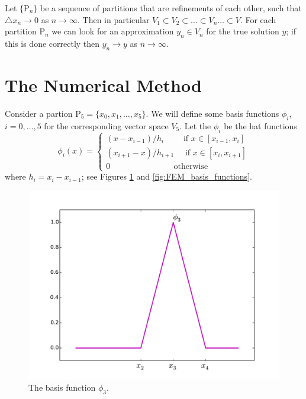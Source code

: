 Let $\{\mathrm{P}_n\}$ be a sequence of partitions that are refinements of each other, such that $\triangle x_n \to 0$ as $n \to \infty$.
Then in particular $V_1 \subset V_2 \subset \ldots \subset V_n \ldots \subset V$.
For each partition $\mathrm{P}_n$ we can look for an approximation $y_n \in V_n$ for the true solution $y$; if this is done  correctly then $y_n \to y$ as $n \to \infty$.

\section*{The Numerical Method}
Consider a partion $\mathrm{P}_5 = \{x_0, x_1, \ldots, x_5\}$. We will define some basis functions $\phi_i$, $i = 0, \ldots, 5$ for the corresponding vector space $V_5$.
Let the $\phi_i$ be the hat functions 
\[\phi_i(x) = \begin{cases}
(x - x_{i-1})/h_i \quad \quad\text{ if } x \in [x_{i-1},x_i]\\
 (x_{i+1} - x)/h_{i+1} \quad \text{ if } x \in [x_{i},x_{i+1}]\\
0 \quad \quad \quad \quad \quad \quad \quad \,\,\text{ otherwise}
\end{cases}\]
where $h_i = x_i - x_{i-1}$; see Figures \ref{fig:FEM_one_basis_function} and \ref{fig:FEM_basis_functions}. 

\begin{figure}[ht]
\centering
\includegraphics[width=\textwidth]{one_basis_function.pdf}
\caption{The basis function $\phi_3$.}
\label{fig:FEM_one_basis_function}
\end{figure}

